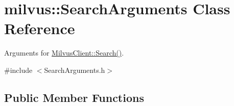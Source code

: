 \hypertarget{classmilvus_1_1_search_arguments}{}\section{milvus\+:\+:Search\+Arguments Class Reference}
\label{classmilvus_1_1_search_arguments}


Arguments for \hyperlink{classmilvus_1_1_milvus_client_a46c70fc2b7c386003babd90e02b299d1}{Milvus\+Client\+::\+Search()}.  




{\ttfamily \#include $<$Search\+Arguments.\+h$>$}

\subsection*{Public Member Functions}
